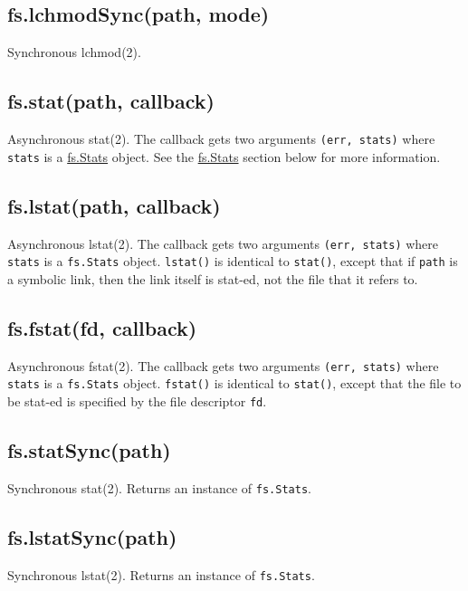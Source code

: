 \subsection{fs.lchmodSync(path, mode)}

Synchronous lchmod(2).

\subsection{fs.stat(path, callback)}

Asynchronous stat(2). The callback gets two arguments
\texttt{(err, stats)} where \texttt{stats} is a
\hyperref[fs\_class\_fs\_stats]{fs.Stats} object. See the
\hyperref[fs\_class\_fs\_stats]{fs.Stats} section below for more
information.

\subsection{fs.lstat(path, callback)}

Asynchronous lstat(2). The callback gets two arguments
\texttt{(err, stats)} where \texttt{stats} is a \texttt{fs.Stats}
object. \texttt{lstat()} is identical to \texttt{stat()}, except that if
\texttt{path} is a symbolic link, then the link itself is stat-ed, not
the file that it refers to.

\subsection{fs.fstat(fd, callback)}

Asynchronous fstat(2). The callback gets two arguments
\texttt{(err, stats)} where \texttt{stats} is a \texttt{fs.Stats}
object. \texttt{fstat()} is identical to \texttt{stat()}, except that
the file to be stat-ed is specified by the file descriptor \texttt{fd}.

\subsection{fs.statSync(path)}

Synchronous stat(2). Returns an instance of \texttt{fs.Stats}.

\subsection{fs.lstatSync(path)}

Synchronous lstat(2). Returns an instance of \texttt{fs.Stats}.


